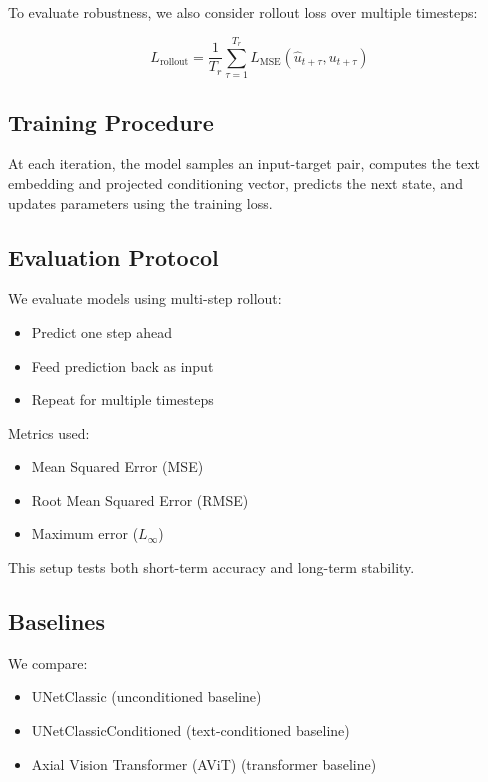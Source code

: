 \documentclass[
]{article}
\providecommand{\tightlist}{%
  \setlength{\itemsep}{0pt}\setlength{\parskip}{0pt}}
\begin{document}
To evaluate robustness, we also consider rollout loss over multiple
timesteps:

\begin{equation}
L_{\mathrm{rollout}} = \frac{1}{T_r} \sum_{\tau=1}^{T_r} L_{\mathrm{MSE}}(\hat{u}_{t+\tau}, u_{t+\tau})
\end{equation}

\subsection{Training Procedure}\label{training-procedure}

At each iteration, the model samples an input-target pair, computes the
text embedding and projected conditioning vector, predicts the next
state, and updates parameters using the training loss.

\subsection{Evaluation Protocol}\label{evaluation-protocol}

We evaluate models using multi-step rollout:

\begin{itemize}
\tightlist
\item
  Predict one step ahead
\item
  Feed prediction back as input
\item
  Repeat for multiple timesteps
\end{itemize}

Metrics used:

\begin{itemize}
\tightlist
\item
  Mean Squared Error (MSE)
\item
  Root Mean Squared Error (RMSE)
\item
  Maximum error (\(L_\infty\))
\end{itemize}

This setup tests both short-term accuracy and long-term stability.

\subsection{Baselines}\label{baselines}

We compare:

\begin{itemize}
\tightlist
\item
  UNetClassic (unconditioned baseline)
\item
  UNetClassicConditioned (text-conditioned baseline)
\item
  Axial Vision Transformer (AViT) (transformer baseline)
\end{itemize}
\end{document}
